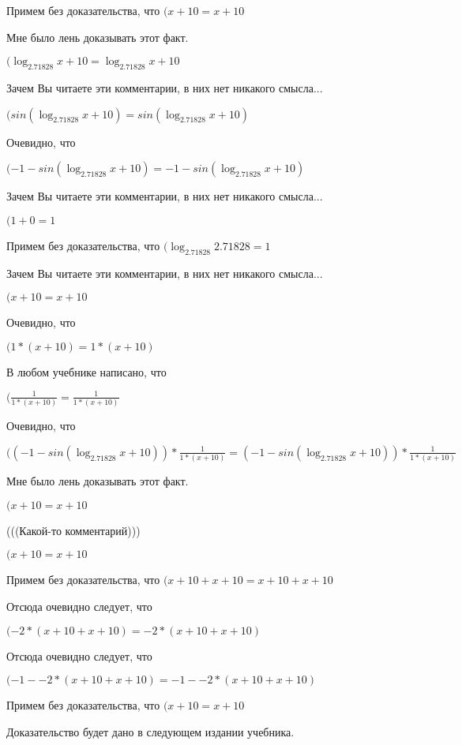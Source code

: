 \documentclass[12pt,a4paper,fleqn]{article}
\theoremstyle{definition}
\begin{document}
Примем без доказательства, что
$( x  +  10  =  x  +  10 $

Мне было лень доказывать этот факт.

$(\log_{ 2.71828 }{ x  +  10 } = \log_{ 2.71828 }{ x  +  10 }$

Зачем Вы читаете эти комментарии, в них нет никакого смысла...

$(sin(\log_{ 2.71828 }{ x  +  10 }) = sin(\log_{ 2.71828 }{ x  +  10 })$

Очевидно, что

$( -1  - sin(\log_{ 2.71828 }{ x  +  10 }) =  -1  - sin(\log_{ 2.71828 }{ x  +  10 })$

Зачем Вы читаете эти комментарии, в них нет никакого смысла...

$( 1  +  0  =  1 $

Примем без доказательства, что
$(\log_{ 2.71828 }{ 2.71828 } =  1 $

Зачем Вы читаете эти комментарии, в них нет никакого смысла...

$( x  +  10  =  x  +  10 $

Очевидно, что

$( 1  * ( x  +  10 ) =  1  * ( x  +  10 )$

В любом учебнике написано, что

$(\frac{ 1 }{ 1  * ( x  +  10 )}
 = \frac{ 1 }{ 1  * ( x  +  10 )}
$

Очевидно, что

$(( -1  - sin(\log_{ 2.71828 }{ x  +  10 })) * \frac{ 1 }{ 1  * ( x  +  10 )}
 = ( -1  - sin(\log_{ 2.71828 }{ x  +  10 })) * \frac{ 1 }{ 1  * ( x  +  10 )}
$

Мне было лень доказывать этот факт.

$( x  +  10  =  x  +  10 $

(((Какой-то комментарий)))

$( x  +  10  =  x  +  10 $

Примем без доказательства, что
$( x  +  10  +  x  +  10  =  x  +  10  +  x  +  10 $

Отсюда очевидно следует, что

$( -2  * ( x  +  10  +  x  +  10 ) =  -2  * ( x  +  10  +  x  +  10 )$

Отсюда очевидно следует, что

$( -1  -  -2  * ( x  +  10  +  x  +  10 ) =  -1  -  -2  * ( x  +  10  +  x  +  10 )$

Примем без доказательства, что
$( x  +  10  =  x  +  10 $

Доказательство будет дано в следующем издании учебника.
\end{document}
